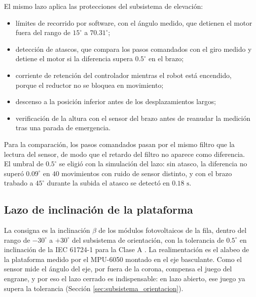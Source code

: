 \documentclass[../../General.tex]{subfiles}
\begin{document}
El mismo lazo aplica las protecciones del subsistema de elevación:
\begin{itemize}
    \item límites de recorrido por software, con el ángulo medido, que detienen el motor fuera del rango de $15^\circ$ a $70.31^\circ$;
    \item detección de atascos, que compara los pasos comandados con el giro medido y detiene el motor si la diferencia supera $0.5^\circ$ en el brazo;
    \item corriente de retención del controlador mientras el robot está encendido, porque el reductor no se bloquea en movimiento;
    \item descenso a la posición inferior antes de los desplazamientos largos;
    \item verificación de la altura con el sensor del brazo antes de reanudar la medición tras una parada de emergencia.
\end{itemize}
Para la comparación, los pasos comandados pasan por el mismo filtro que la lectura del sensor, de modo que el retardo del filtro no aparece como diferencia. El umbral de $0.5^\circ$ se eligió con la simulación del lazo: sin atasco, la diferencia no superó $0.09^\circ$ en $40$ movimientos con ruido de sensor distinto, y con el brazo trabado a $45^\circ$ durante la subida el atasco se detectó en $0.18\text{ s}$.


\subsection{Lazo de inclinación de la plataforma}\label{subsec:lazo_inclinacion}

La consigna es la inclinación $\beta$ de los módulos fotovoltaicos de la fila, dentro del rango de $-30^\circ$ a $+30^\circ$ del subsistema de orientación, con la tolerancia de $0.5^\circ$ en inclinación de la IEC 61724-1 para la Clase A \citep{IEC61724-1_2021}. La realimentación es el alabeo de la plataforma medido por el MPU-6050 montado en el eje basculante. Como el sensor mide el ángulo del eje, por fuera de la corona, compensa el juego del engrane, y por eso el lazo cerrado es indispensable: en lazo abierto, ese juego ya supera la tolerancia (Sección \ref{sec:subsistema_orientacion}).
\end{document}
